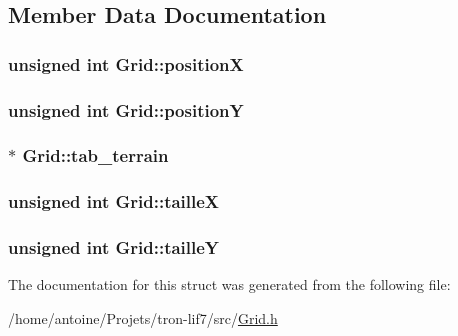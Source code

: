 \subsection{Member Data Documentation}
\hypertarget{structGrid_a01a62bbb0e4ec1364b93c32e0170499b}{
\subsubsection[{position\-X}]{\setlength{\rightskip}{0pt plus 5cm}unsigned int Grid\-::position\-X}}\label{structGrid_a01a62bbb0e4ec1364b93c32e0170499b}
\hypertarget{structGrid_a870a6d3ab4963b9efdc7e4fb975133d4}{
\subsubsection[{position\-Y}]{\setlength{\rightskip}{0pt plus 5cm}unsigned int Grid\-::position\-Y}}\label{structGrid_a870a6d3ab4963b9efdc7e4fb975133d4}
\hypertarget{structGrid_a133dbdd9816a6ba8bd35e5787c8f2a9d}{
\subsubsection[{tab\-\_\-terrain}]{$\ast$ Grid\-::tab\-\_\-terrain}}\label{structGrid_a133dbdd9816a6ba8bd35e5787c8f2a9d}
\hypertarget{structGrid_ad6ec58066a6303fbc2aa5443840cf067}{
\subsubsection[{taille\-X}]{\setlength{\rightskip}{0pt plus 5cm}unsigned int Grid\-::taille\-X}}\label{structGrid_ad6ec58066a6303fbc2aa5443840cf067}
\hypertarget{structGrid_adc12ffc8da211af2444db8a2007e5a7d}{
\subsubsection[{taille\-Y}]{\setlength{\rightskip}{0pt plus 5cm}unsigned int Grid\-::taille\-Y}}\label{structGrid_adc12ffc8da211af2444db8a2007e5a7d}


The documentation for this struct was generated from the following file\-:\begin{DoxyCompactItemize}
\item 
/home/antoine/\-Projets/tron-\/lif7/src/\hyperlink{Grid_8h}{Grid.\-h}\end{DoxyCompactItemize}
